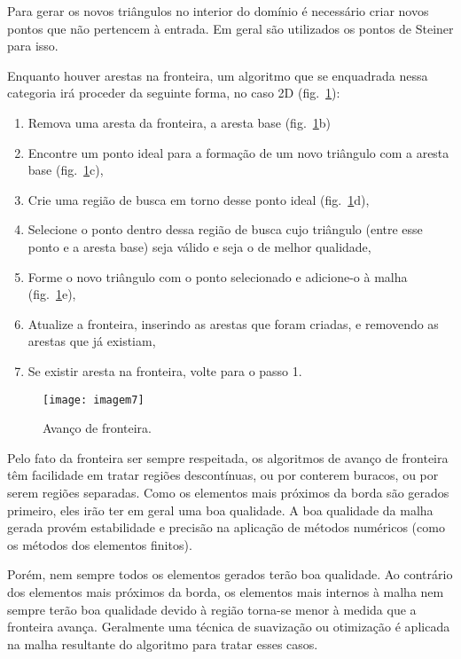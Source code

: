 Para gerar os novos triângulos no interior do domínio é necessário criar novos pontos que não pertencem à entrada. Em geral são utilizados os pontos de Steiner para isso.

Enquanto houver arestas na fronteira, um algoritmo que se enquadrada nessa categoria irá proceder da seguinte forma, no caso 2D (fig.~\ref{fig:imagem7}):
 
 \begin{enumerate}
\item{ Remova uma aresta da fronteira, a aresta base (fig.~\ref{fig:imagem7}b)}
\item{ Encontre um ponto ideal para a formação de um novo triângulo com a aresta base (fig.~\ref{fig:imagem7}c),}
\item{ Crie uma região de busca em torno desse ponto ideal (fig.~\ref{fig:imagem7}d),}
\item{ Selecione o ponto dentro dessa região de busca cujo triângulo (entre esse ponto e a aresta base) seja válido e seja o de melhor qualidade,}
\item{ Forme o novo triângulo com o ponto selecionado e adicione-o à malha (fig.~\ref{fig:imagem7}e),}
\item{ Atualize a fronteira, inserindo as arestas que foram criadas, e removendo as arestas que já existiam,}
\item{ Se existir aresta na fronteira, volte para o passo 1.}
\end{enumerate}

 \begin{figure}[htbp]
     \centering
     \texttt{[image: imagem7]}
     \caption{Avanço de fronteira. \cite{bib:Freitas10}} 
     \label{fig:imagem7}
 \end{figure}

 Pelo fato da fronteira ser sempre respeitada, os algoritmos de avanço de fronteira têm facilidade em tratar regiões descontínuas, ou por conterem buracos, ou por serem regiões separadas. Como os elementos mais próximos da borda são gerados primeiro, eles irão ter em geral uma boa qualidade. A boa qualidade da malha gerada provém estabilidade e precisão na aplicação de métodos numéricos (como os métodos dos elementos finitos).

Porém, nem sempre todos os elementos gerados terão boa qualidade. Ao contrário dos elementos mais próximos da borda, os elementos mais internos à malha nem sempre terão boa qualidade devido à região torna-se menor à medida que a fronteira avança. Geralmente uma técnica de suavização ou otimização é aplicada na malha resultante do algoritmo para tratar esses casos.

